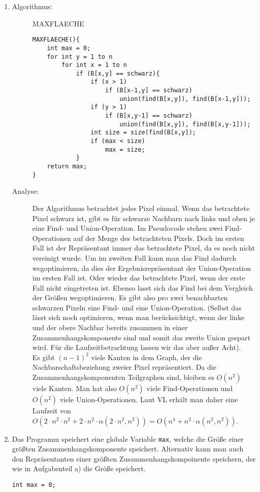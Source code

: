 \documentclass[a4paper,10pt]{article}
\begin{document}
\begin{enumerate}
\item \begin{description}
	\item[Algorithmus:] MAXFLAECHE \begin{lstlisting}
MAXFLAECHE(){
	int max = 0;
	for int y = 1 to n
		for int x = 1 to n
			if (B[x,y] == schwarz){
				if (x > 1)
					if (B[x-1,y] == schwarz)
						union(find(B[x,y]), find(B[x-1,y]));
				if (y > 1)
					if (B[x,y-1] == schwarz)
						union(find(B[x,y]), find(B[x,y-1]));
				int size = size(find(B[x,y]);
				if (max < size)
					max = size;
			}
	return max;
}
	\end{lstlisting}
\item[Analyse:] Der Algorithmus betrachtet jedes Pixel einmal. Wenn das betrachtete Pixel schwarz ist, gibt es für schwarze Nachbarn nach links und oben je eine Find- und Union-Operation. Im Pseudocode stehen zwei Find-Operationen auf der Menge des betrachteten Pixels. Doch im ersten Fall ist der Repräsentant immer das betrachtete Pixel, da es noch nicht vereinigt wurde. Um im zweiten Fall kann man das Find dadurch wegoptimieren, da dies der Ergebnisrepräsentant der Union-Operation im ersten Fall ist. Oder wieder das betrachtete Pixel, wenn der erste Fall nicht eingetreten ist. Ebenso lasst sich das Find bei dem Vergleich der Größen wegoptimieren. Es gibt also pro zwei benachbarten schwarzen Pixeln eine Find- und eine Union-Operation. (Selbst das lässt sich noch optimieren, wenn man berücksichtigt, wenn der linke und der obere Nachbar bereits zusammen in einer Zusammenhangskomponente sind und somit das zweite Union gespart wird. Für die Laufzeitbetrachtung lassen wir das aber außer Acht).\\
Es gibt $(n-1)^2$ viele Kanten in dem Graph, der die Nachbarschaftsbeziehung zweier Pixel repräsentiert. Da die Zusammenhangskomponenten Teilgraphen sind, bleiben es $O(n^2)$ viele Kanten. Man hat also $O(n^2)$ viele Find-Operationen und $O(n^2)$ viele Union-Operationen. Laut VL erhält man daher eine Laufzeit von $O(2 \cdot n^2 \cdot n^2 + 2 \cdot n^2 \cdot \alpha (2 \cdot n^2,n^2)) = O(n^4 + n^2 \cdot \alpha (n^2,n^2))$.
\end{description}
\item Das Programm speichert eine globale Variable \texttt{max}, welche die Größe einer größten Zusammenhangskomponente speichert. Alternativ kann man auch den Repräsentanten einer größten Zusammenhangskompoinente speichern, der wie in Aufgabenteil a) die Größe speichert.\begin{lstlisting}
int max = 0;


\end{lstlisting}
\end{enumerate}
\end{document}
